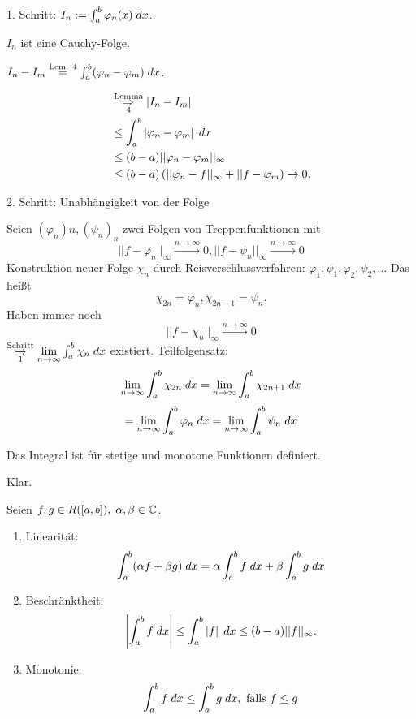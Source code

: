 \documentclass[../ana2.tex]{subfiles}
\begin{document}
\begin{bew}
    1. Schritt: \( I_n := \integral{\varphi_n(x)}{a}{b} \).
    \begin{beh}
        \( I_n \) ist eine Cauchy-Folge.
    \end{beh}
    \begin{bew}
        \( I_n - I_m \oversett{Lem. 4}{=} 
        \integral{(\varphi_n - \varphi_m)}{a}{b} \).

        \begin{align*}
            &\overundersett{Lemma}{4}{\Rightarrow} \abs{I_n - I_m} \\
            &\leq \integral{\abs{\varphi_n - \varphi_m}}{a}{b} \\
            &\leq (b-a) ||\varphi_n - \varphi_m||_\infty \\
            &\leq (b-a) \left( ||\varphi_n - f||_\infty 
            + ||f - \varphi_m \right) \rightarrow 0.
        \end{align*}
    \end{bew}
    2. Schritt: Unabhängigkeit von der Folge
    \begin{bew}
        Seien \( (\varphi_n)n, (\psi_n)_n \) zwei Folgen 
        von Treppenfunktionen mit 
        \[ ||f-\varphi_n||_\infty \overset{n\rightarrow \infty}{\rightarrow} 0, 
        ||f-\psi_n||_\infty \overset{n\rightarrow \infty}{\longrightarrow} 0 \]
        Konstruktion neuer Folge \(\chi_n \) durch Reisverschlussverfahren:
        \( \varphi_1, \psi_1, \varphi_2, \psi_2, \ldots \)
        Das heißt
        \[ \chi_{2n} = \varphi_n, \chi_{2n-1} = \psi_n. \]
        Haben immer noch
        \[ ||f - \chi_n||_\infty \overset{n \rightarrow \infty}{\rightarrow} 0 \]
        \( \overundersett{Schritt}{1}{\rightarrow} \limes{n} \integral{\chi_n}{a}{b} \)
        existiert.
        Teilfolgensatz:     
        \[ \limes{n} \integral{\chi_{2n}}{a}{b} = \limes{n} 
        \integral{\chi_{2n+1}}{a}{b} \]
        \[ = \limes{n} \integral{\varphi_n}{a}{b} 
        = \limes{n} \integral{\psi_n}{a}{b} \]
    \end{bew}
\end{bew}
\begin{kor}
    Das Integral ist für stetige und monotone 
    Funktionen definiert.
\end{kor}
\begin{bew}
    Klar.
\end{bew}
\begin{satz}
    Seien \( f,g \in R([a,b]),\; \alpha, \beta \in \C \).
    \begin{enumerate}[label=(\alph*)]
        
        \item Linearität: \[ \integral{(\alpha f + \beta g)}{a}{b}
        = \alpha \integral{f}{a}{b} + \beta \integral{g}{a}{b} \]
        \item Beschränktheit: \[ \abs{\integral{f}{a}{b}} \leq 
        \integral{\abs{f}}{a}{b} 
        \leq (b-a)||f||_\infty. \]
        \item Monotonie: \[ \integral{f}{a}{b} 
        \leq \integral{g}{a}{b}, \text{ falls } f \leq g \]
    \end{enumerate}
\end{satz}
\end{document}
